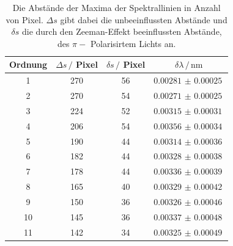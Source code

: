 \begin{table}
    \centering
    \caption{Die Abstände der Maxima der Spektrallinien in Anzahl von Pixel.
    $\Delta s$ gibt dabei die unbeeinflussten Abstände und $\delta s$ die durch den Zeeman-Effekt beeinflussten Abstände, des $\pi -$ Polarisirtem Lichts an.}
    \begin{tabular}{cccc}
        \toprule
        Ordnung & $\Delta s \, /$ Pixel  & $\delta s \, /$ Pixel & $\delta \lambda \, / \, \si{\nano\meter}$  \\
        \midrule
        1  &    270 &   56  & $\SI{0.00281(25)}{}$ \\
        2  &    270 &   54  & $\SI{0.00271(25)}{}$ \\
        3  &    224 &   52  & $\SI{0.00315(31)}{}$ \\
        4  &    206 &   54  & $\SI{0.00356(34)}{}$ \\
        5  &    190 &   44  & $\SI{0.00314(36)}{}$ \\
        6  &    182 &   44  & $\SI{0.00328(38)}{}$ \\
        7  &    178 &   44  & $\SI{0.00336(39)}{}$ \\
        8  &    165 &   40  & $\SI{0.00329(42)}{}$ \\
        9  &    150 &   36  & $\SI{0.00326(46)}{}$ \\
        10 &    145 &   36  & $\SI{0.00337(48)}{}$ \\
        11 &    142 &   34  & $\SI{0.00325(49)}{}$ \\
        \bottomrule
    \end{tabular}
    \label{tab:blau-pi}
\end{table}

